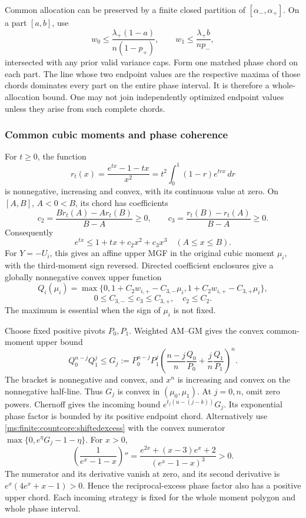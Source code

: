 Common allocation can be preserved by a finite closed partition of
\([\alpha_-,\alpha_+]\). On a part \([a,b]\), use
\[
 w_0\le\frac{\lambda_+(1-a)}{n(1-p_+)},\qquad
 w_1\le\frac{\lambda_+b}{np_-},
\]
intersected with any prior valid variance caps. Form one matched phase
chord on each part. The line whose two endpoint values are the respective
maxima of those chords dominates every part on the entire phase interval.
It is therefore a whole-allocation bound. One may not join independently
optimized endpoint values unless they arise from such complete chords.

\subsubsection{Common cubic moments and phase coherence}

For \(t\ge0\), the function
\[
 r_t(x)=\frac{e^{tx}-1-tx}{x^2}
       =t^2\int_0^1(1-r)e^{trx}\,dr
\]
is nonnegative, increasing and convex, with its continuous value at zero.
On \([A,B]\), \(A<0<B\), its chord has coefficients
\[
 c_2=\frac{Br_t(A)-Ar_t(B)}{B-A}\ge0,\qquad
 c_3=\frac{r_t(B)-r_t(A)}{B-A}\ge0.
\]
Consequently
\[
 e^{tx}\le1+tx+c_2x^2+c_3x^3\quad(A\le x\le B).
\]
For \(Y=-U_i\), this gives an affine upper MGF in the original cubic
moment \(\mu_i\), with the third-moment sign reversed. Directed
coefficient enclosures give a globally nonnegative convex upper function
\[
 Q_i(\mu_i)=\max\{0,1+C_2w_{i,+}-C_{3,-}\mu_i,
                         1+C_2w_{i,+}-C_{3,+}\mu_i\},
\]
\[
 0\le C_{3,-}\le c_3\le C_{3,+},\quad c_2\le C_2.
\]
The maximum is essential when the sign of \(\mu_i\) is not fixed.

Choose fixed positive pivots \(P_0,P_1\). Weighted AM--GM gives the
convex common-moment upper bound
\begin{equation}
 Q_0^{n-j}Q_1^j
 \le G_j:=P_0^{n-j}P_1^j
 \left(\frac{n-j}{n}\frac{Q_0}{P_0}
                +\frac jn\frac{Q_1}{P_1}\right)^n.
 \label{ms:finite:countcore:convexmgf}
\end{equation}
The bracket is nonnegative and convex, and \(x^n\) is increasing and
convex on the nonnegative half-line. Thus \(G_j\) is convex in
\((\mu_0,\mu_1)\). At \(j=0,n\), omit zero powers.
Chernoff gives the incoming bound
\(e^{t_j(u-(j-k))}G_j\). Its exponential phase factor is bounded by
its positive endpoint chord. Alternatively use
\eqref{ms:finite:countcore:shiftedexcess} with the convex numerator
\(\max\{0,e^\eta G_j-1-\eta\}\). For \(x>0\),
\[
 \left(\frac1{e^x-1-x}\right)''
 =\frac{e^{2x}+(x-3)e^x+2}{(e^x-1-x)^3}>0.
\]
The numerator and its derivative vanish at zero, and its second derivative
is \(e^x(4e^x+x-1)>0\). Hence the reciprocal-excess phase factor
also has a positive upper chord. Each incoming strategy is fixed for the
whole moment polygon and whole phase interval.

